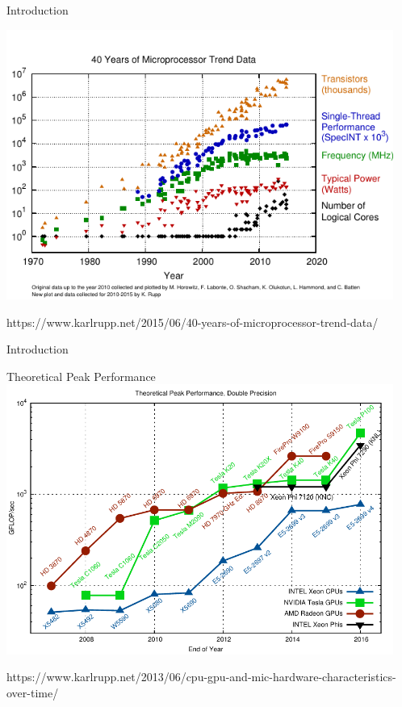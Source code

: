



\begin{frame}{Introduction}
 \vspace*{-0.5cm}
 \begin{center}
  \includegraphics[width=0.95\textwidth]{figures/40-years-processor-trend}
 \end{center}
 {\tiny https://www.karlrupp.net/2015/06/40-years-of-microprocessor-trend-data/ }
\end{frame}

\begin{frame}{Introduction}
 \vspace*{-0.5cm}
 \begin{center}
  Theoretical Peak Performance \\
  \includegraphics[width=0.95\textwidth]{figures/gflops-dp}
 \end{center}
 \vspace*{-0.5cm}
 {\tiny https://www.karlrupp.net/2013/06/cpu-gpu-and-mic-hardware-characteristics-over-time/ }
\end{frame}

